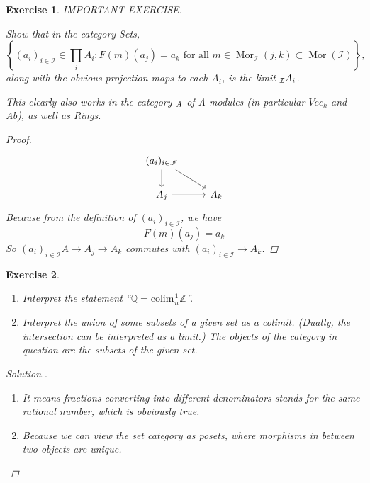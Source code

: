 \documentclass{article}
\theoremstyle{breakstyle}
\newtheorem{exercise}{Exercise}[section]
\newenvironment{solution}
  {\begin{proof}[Solution.]\renewcommand{\qedsymbol}{}}
  {\end{proof}}
\DeclareMathOperator{\mor}{Mor}
\let\lim\relax
\DeclareMathOperator{\lim}{Lim}
\let\mod\relax
\DeclareMathOperator{\mod}{Mod}
\begin{document}
\begin{exercise}
IMPORTANT EXERCISE.

Show that in the category Sets,
$$
\left\{(a_{i})_{i \in \mathscr{I}} \in \prod_{i} A_{i}: F(m)(a_{j}) =
a_{k} \text{ for all } m \in \mor_{\mathscr{I}}(j, k) \subset
\mor(\mathscr{I})\right\},
$$
along with the obvious projection maps to each $A_{i}$, is the limit
$\lim_{\mathcal{I}} A_{i}$.

This clearly also works in the category $\mod_{A}$ of A-modules (in
particular $Vec_{k}$ and Ab), as well as Rings.

\begin{proof}
	$$
	\begin{tikzcd}
        (a_i)_{i\in \mathscr{I}} \arrow[d] \arrow[rd] &     \\
        A_j \arrow[r]                       & A_k
    \end{tikzcd}
	$$ 
	Because from the definition of $(a_{i})_{i\in \mathscr{I}}$, we have
	$$
	F(m)(a_{j})=a_{k}
	$$ 
    So $(a_{i})_{i\in \mathscr{I}}A\longrightarrow A_{j}\longrightarrow A_{k}$
    commutes with $(a_{i})_{i\in \mathscr{I}}\longrightarrow A_{k}$.
\end{proof}

\end{exercise}

\begin{exercise}
\begin{enumerate}[label=({\alph*})]
\item Interpret the statement ``$\mathbb{Q} = \text{colim} \frac{1}{n}
    \mathbb{Z}$''.
\item Interpret the union of some subsets of a given set as a colimit.
    (Dually, the intersection can be interpreted as a limit.) The objects of
    the category in question are the subsets of the given set.
\end{enumerate}

\begin{solution}
	\begin{enumerate}
        \item It means fractions converting into different denominators stands
            for the same rational number, which is obviously true.
        \item Because we can view the set category as posets, where morphisms in
            between two objects are unique.
	\end{enumerate}
\end{solution}

\end{exercise}
\end{document}
